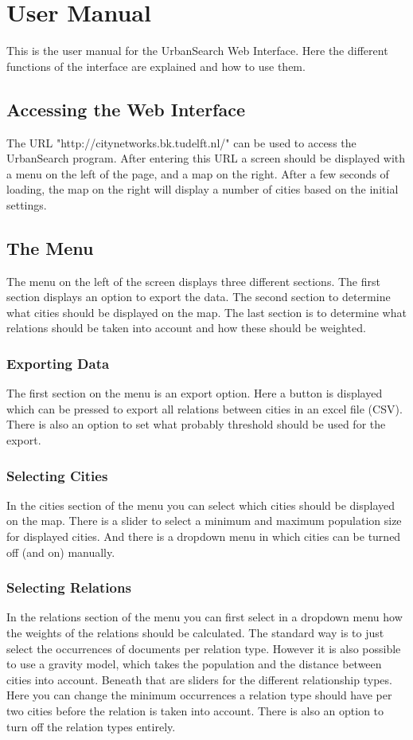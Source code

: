 \chapter{User Manual}
This is the user manual for the UrbanSearch Web Interface. Here  the different functions of the interface are explained and how to use them. 

\section{Accessing the Web Interface}
The URL "http://citynetworks.bk.tudelft.nl/" can be used to access the UrbanSearch program. After entering this URL a screen should be displayed with a menu on the left of the page, and a map on the right. After a few seconds of loading, the map on the right will display a number of cities based on the initial settings. 


\section{The Menu}
The menu on the left of the screen displays three different sections. The first section displays an option to export the data. The second section to determine what cities should be displayed on the map. The last section is to determine what relations should be taken into account and how these should be weighted.

\subsection{Exporting Data}
The first section on the menu is an export option. Here a button is displayed which can be pressed to export all relations between cities in an excel file (CSV). There is also an option to set what probably threshold should be used for the export. 


\subsection{Selecting Cities}
In the cities section of the menu you can select which cities should be displayed on the map. There is a slider to select a minimum and maximum population size for displayed cities. And there is a dropdown menu in which cities can be turned off (and on) manually. 


\subsection{Selecting Relations}
In the relations section of the menu you can first select in a dropdown menu how the weights of the relations should be calculated. The standard way is to just select the occurrences of documents per relation type. However it is also possible to use a gravity model, which takes the population and the distance between cities into account.  Beneath that are sliders for the different relationship types. Here you can change the minimum occurrences a relation type should have per two cities before the relation is taken into account. There is also an option to turn off the relation types entirely.



